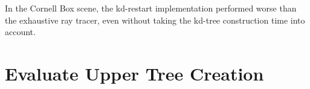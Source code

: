 In the Cornell Box scene, the kd-restart implementation performed worse than the
exhaustive ray tracer, even without taking the kd-tree construction time into
account.






\section{Evaluate Upper Tree Creation}\label{sec:evaluateUpperTree}



